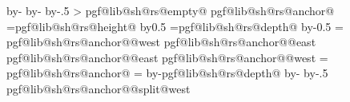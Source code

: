 {{{                \advance\pgf@y by-\innerysep\relax%
                \advance\pgf@y by-\outerysep\relax%
                \advance\pgf@y by-.5\pgflinewidth%
            }%
            \addtosavedmacro\southwest%
            \pgfextract@process{}%
            \addtosavedmacro\centerpoint%
            \pgfmathloop%
                \ifnum\pgfmathcounter>\parts%
                \else%
                    \pgf@lib@sh@getalpha\pgf@lib@sh@rs@number{\pgfmathcounter}%
                    \expandafter\ifx\csname pgf@lib@sh@rs@empty@\pgf@lib@sh@rs@number\endcsname\pgfutil@empty%
                    \else%
                        \csname pgf@lib@sh@rs@anchor@\pgf@lib@sh@rs@number\endcsname%
                        \pgf@ya=\csname pgf@lib@sh@rs@height@\pgf@lib@sh@rs@number\endcsname\relax%
                        \advance\pgf@y by0.5\pgf@ya%
                        \pgf@ya=\csname pgf@lib@sh@rs@depth@\pgf@lib@sh@rs@number\endcsname\relax%
                        \advance\pgf@y by-0.5\pgf@ya%
                        \pgf@ya=\pgf@y%
                        \expandafter\pgfextract@process\csname pgf@lib@sh@rs@anchor@\pgf@lib@sh@rs@number @west\endcsname{%
                            \southwest%
                            \pgf@y=\pgf@ya%
                        }%
                        \expandafter\pgfextract@process\csname pgf@lib@sh@rs@anchor@\pgf@lib@sh@rs@number @east\endcsname{%
                            \northeast%
                            \pgf@y=\pgf@ya%
                        }%
                        \expandafter\addtosavedmacro\csname pgf@lib@sh@rs@anchor@\pgf@lib@sh@rs@number @east\endcsname%
                        \expandafter\addtosavedmacro\csname pgf@lib@sh@rs@anchor@\pgf@lib@sh@rs@number @west\endcsname%
                        \ifnum\pgfmathcounter=\parts%
                        \else%
                            \csname pgf@lib@sh@rs@anchor@\pgf@lib@sh@rs@number\endcsname%
                            \pgf@ya=\pgf@y%
                            \advance\pgf@ya by-\csname pgf@lib@sh@rs@depth@\pgf@lib@sh@rs@number\endcsname\relax%
                            \advance\pgf@ya by-\innerysep\relax%
                            \advance\pgf@ya by-.5\pgflinewidth%
                            \expandafter\pgfextract@process\csname pgf@lib@sh@rs@anchor@\pgf@lib@sh@rs@number @split@west\endcsname{%
                                \southwest%
                                \pgf@y=\pgf@ya%
}}}
